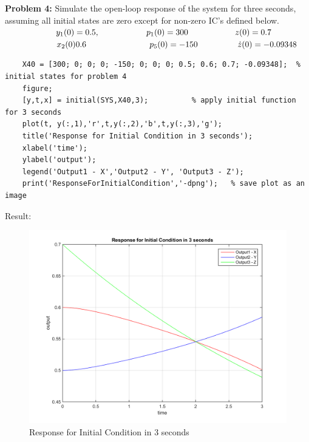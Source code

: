 \documentclass[14pt,a4paper]{article}
\begin{document}
\large\textbf{Problem 4:} Simulate the open-loop response of the system for three seconds, assuming all initial states are zero except for non-zero IC's defined below.\\
$ \hspace*{2cm} y_1(0) = 0.5, \hspace{2cm}        p_1(0) = 300   \hspace{2cm}   z(0) = 0.7 $\\
$\hspace*{2cm} x_2(0) 0.6 \hspace{2.7cm}      p_5(0) = - 150  \hspace{1.7cm}   \dot{z}(0) = - 0.09348 $ 
	\begin{lstlisting}
	X40 = [300; 0; 0; 0; -150; 0; 0; 0; 0.5; 0.6; 0.7; -0.09348];  % initial states for problem 4
	figure;
	[y,t,x] = initial(SYS,X40,3);          % apply initial function for 3 seconds
	plot(t, y(:,1),'r',t,y(:,2),'b',t,y(:,3),'g');
	title('Response for Initial Condition in 3 seconds');
	xlabel('time');
	ylabel('output');
	legend('Output1 - X','Output2 - Y', 'Output3 - Z');
	print('ResponseForInitialCondition','-dpng');   % save plot as an image
	\end{lstlisting}
	Result: 
	\begin{figure}[htp]
		\begin{center}
			\includegraphics[scale = 0.7]{ResponseForInitialCondition.png}
		\end{center}
		\caption{Response for Initial Condition in 3 seconds}
	\end{figure}\\
\pagebreak
	
\end{document}
